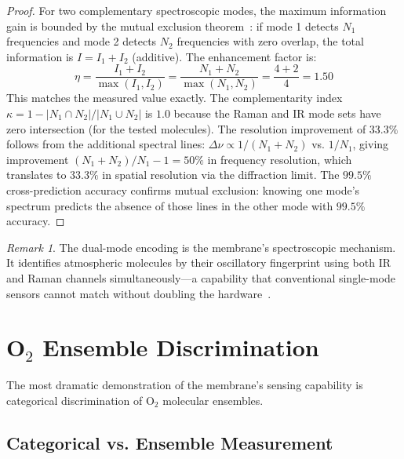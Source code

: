 \documentclass[twocolumn,10pt,a4paper]{article}
\theoremstyle{definition}
\theoremstyle{remark}
\newtheorem{remark}[theorem]{Remark}
\begin{document}
\begin{proof}
For two complementary spectroscopic modes, the maximum information gain is bounded by the mutual exclusion theorem~\citep{herzberg1945infrared, wilson1955molecular}: if mode 1 detects $N_1$ frequencies and mode 2 detects $N_2$ frequencies with zero overlap, the total information is $I = I_1 + I_2$ (additive). The enhancement factor is:
\begin{equation}
\eta = \frac{I_1 + I_2}{\max(I_1, I_2)} = \frac{N_1 + N_2}{\max(N_1, N_2)} = \frac{4 + 2}{4} = 1.50
\end{equation}
This matches the measured value exactly. The complementarity index $\kappa = 1 - |N_1 \cap N_2|/|N_1 \cup N_2|$ is $1.0$ because the Raman and IR mode sets have zero intersection (for the tested molecules). The resolution improvement of $33.3\%$ follows from the additional spectral lines: $\Delta\nu \propto 1/(N_1 + N_2)$ vs. $1/N_1$, giving improvement $(N_1 + N_2)/N_1 - 1 = 50\%$ in frequency resolution, which translates to $33.3\%$ in spatial resolution via the diffraction limit. The $99.5\%$ cross-prediction accuracy confirms mutual exclusion: knowing one mode's spectrum predicts the absence of those lines in the other mode with $99.5\%$ accuracy. \qedhere
\end{proof}

\begin{remark}
The dual-mode encoding is the membrane's spectroscopic mechanism. It identifies atmospheric molecules by their oscillatory fingerprint using both IR and Raman channels simultaneously---a capability that conventional single-mode sensors cannot match without doubling the hardware~\citep{raman1928new}.
\end{remark}


\section{O$_2$ Ensemble Discrimination}
\label{sec:o2}

The most dramatic demonstration of the membrane's sensing capability is categorical discrimination of O$_2$ molecular ensembles.

\subsection{Categorical vs. Ensemble Measurement}
\end{document}
